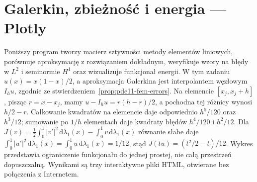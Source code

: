 \section{Galerkin, zbieżność i energia — Plotly}
\label{sec:pde11-code}
Poniższy program tworzy macierz sztywności metody elementów liniowych,
porównuje aproksymację z rozwiązaniem dokładnym, weryfikuje wzory
na błędy w $L^2$ i seminormie $H^1$ oraz wizualizuje funkcjonał energii.
W tym zadaniu $u(x)=x(1-x)/2$, a aproksymacja Galerkina
jest interpolantem węzłowym $I_hu$, zgodnie ze
stwierdzeniem~\ref{prop:pde11-fem-errors}.
Na elemencie $[x_j,x_j+h]$, pisząc $r=x-x_j$,
mamy $u-I_hu=r(h-r)/2$, a pochodna tej różnicy
wynosi $h/2-r$. Całkowanie kwadratów na elemencie
daje odpowiednio $h^5/120$ oraz $h^3/12$; sumowanie
po $1/h$ elementach daje kwadraty błędów
$h^4/120$ i $h^2/12$.
Dla $J(v)=\frac12\int_0^1|v'|^2\,\mathrm d\lambda_1(x)
-\int_0^1v\,\mathrm d\lambda_1(x)$ równanie słabe daje
$\int_0^1|u'|^2\,\mathrm d\lambda_1(x)
=\int_0^1u\,\mathrm d\lambda_1(x)=1/12$,
stąd $J(tu)=(t^2/2-t)/12$.
Wykres przedstawia ograniczenie funkcjonału do jednej
prostej, nie całą przestrzeń dopuszczalną.
Wynikami są trzy interaktywne pliki HTML, otwierane bez połączenia
z Internetem.
